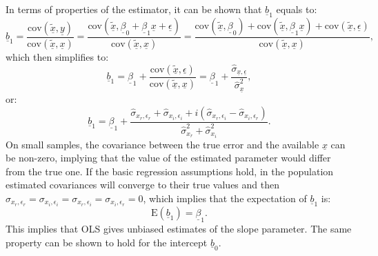 \documentclass[
]{book}
\begin{document}
In terms of properties of the estimator, it can be shown that \(\underline{b}_1\) equals to:
\begin{equation}
        \underline{b}_1 = \frac{\mathrm{cov}(\underline{\tilde{x}}, \underline{y})}{\mathrm{cov}(\underline{\tilde{x}},\underline{x})} = \frac{\mathrm{cov}(\underline{\tilde{x}}, \underline{\beta}_0 + \underline{\beta}_1 \underline{x} + \underline{\epsilon})}{\mathrm{cov}(\underline{\tilde{x}},\underline{x})} = \frac{\mathrm{cov}(\underline{\tilde{x}}, \underline{\beta}_0) + \mathrm{cov}(\underline{\tilde{x}}, \underline{\beta}_1 \underline{x}) + \mathrm{cov}(\underline{\tilde{x}}, \underline{\epsilon})}{\mathrm{cov}(\underline{\tilde{x}},\underline{x})},
    \label{eq:SimpleCLROLSb1Value01}
\end{equation}
which then simplifies to:
\begin{equation}
        \underline{b}_1 = \underline{\beta}_1 + \frac{\mathrm{cov}(\underline{\tilde{x}}, \underline{\epsilon})}{\mathrm{cov}(\underline{\tilde{x}},\underline{x})} = \underline{\beta}_1 + \frac{\hat{\sigma}_{\underline{x},\underline{\epsilon}}}{\hat{\sigma}_{\underline{x}}^2} ,
    \label{eq:SimpleCLROLSb1Value02}
\end{equation}
or:
\begin{equation}
        \underline{b}_1 = \underline{\beta}_1 + \frac{\hat{\sigma}_{x_r, \epsilon_r} + \hat{\sigma}_{x_i, \epsilon_i} + i (\hat{\sigma}_{x_r, \epsilon_i} - \hat{\sigma}_{x_i, \epsilon_r})}{\hat{\sigma}_{x_r}^2 + \hat{\sigma}_{x_i}^2} .
    \label{eq:SimpleCLROLSb1Value03}
\end{equation}
On small samples, the covariance between the true error and the available \(\underline{x}\) can be non-zero, implying that the value of the estimated parameter would differ from the true one. If the basic regression assumptions hold, in the population estimated covariances will converge to their true values and then \({\sigma}_{x_r, \epsilon_r} = {\sigma}_{x_i, \epsilon_i} = {\sigma}_{x_r, \epsilon_i} = {\sigma}_{x_i, \epsilon_r}=0\), which implies that the expectation of \(\underline{b}_1\) is:
\begin{equation}
        \mathrm{E}(\underline{b}_1) = \underline{\beta}_1 .
    \label{eq:SimpleCLROLSb1Expectation}
\end{equation}
This implies that OLS gives unbiased estimates of the slope parameter. The same property can be shown to hold for the intercept \(\underline{b}_0\).
\end{document}
